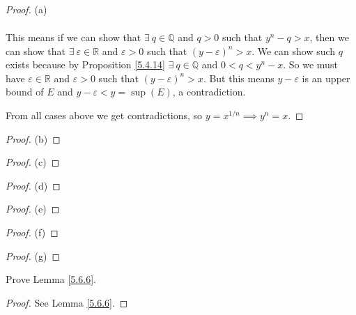 \begin{proof}{(a)}
\begin{enumerate}[label=(\Roman*)]
\begin{align*}
    \end{align*}
    This means if we can show that \(\exists\ q \in \mathds{Q}\) and \(q > 0\) such that \(y^n - q > x\), then we can show that \(\exists\ \varepsilon \in \mathds{R}\) and \(\varepsilon > 0\) such that \((y - \varepsilon)^n > x\).
    We can show such \(q\) exists because by Proposition \ref{5.4.14} \(\exists\ q \in \mathds{Q}\) and \(0 < q < y^n - x\).
    So we must have \(\varepsilon \in \mathds{R}\) and \(\varepsilon > 0\) such that \((y - \varepsilon)^n > x\).
    But this means \(y - \varepsilon\) is an upper bound of \(E\) and \(y - \varepsilon < y = \sup(E)\), a contradiction.
\end{enumerate}
From all cases above we get contradictions, so \(y = x^{1 / n} \implies y^n = x\).
\end{proof}

\begin{proof}{(b)}
\end{proof}

\begin{proof}{(c)}

\end{proof}

\begin{proof}{(d)}

\end{proof}

\begin{proof}{(e)}

\end{proof}

\begin{proof}{(f)}

\end{proof}

\begin{proof}{(g)}

\end{proof}

\exercisesection

\begin{exercise}\label{ex 5.6.1}
Prove Lemma \ref{5.6.6}.
\end{exercise}

\begin{proof}
See Lemma \ref{5.6.6}.
\end{proof}